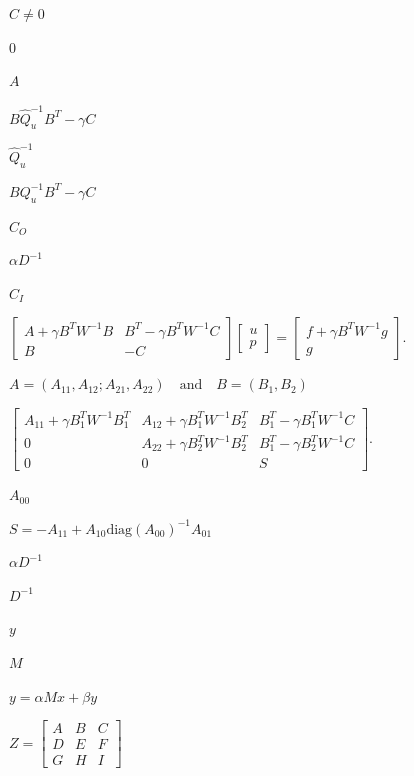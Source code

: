 \documentclass{article}
\begin{document}
$C\neq 0$
\pagebreak

$0$
\pagebreak

$A$
\pagebreak

$B \hat{Q}_u^{-1} B^T - \gamma C$
\pagebreak

$\hat{Q}_u^{-1}$
\pagebreak

$B Q_u^{-1} B^T - \gamma C$
\pagebreak

$C_O$
\pagebreak

$\alpha D^{-1}
$
\pagebreak

$C_I$
\pagebreak

$\left[ \begin{array}{cc}
A + \gamma B^T W^{-1} B & B^T - \gamma B^T W^{-1} C \\
B & -C
\end{array} \right]
\left[ \begin{array}{c}
u \\
p
\end{array} \right]
=
\left[ \begin{array}{c}
f + \gamma B^T W^{-1} g \\
g
\end{array} \right].
$
\pagebreak

$ A = (A_{11}, A_{12}; A_{21}, A_{22})
\quad \mathrm{and} \quad
B = (B_1, B_2)
$
\pagebreak

$\left[ \begin{array}{ccc}
A_{11} + \gamma B_1^T W^{-1} B_1^T & A_{12} + \gamma B_1^T W^{-1} B_2^T & B_1^T - \gamma B_1^T
W^{-1} C \\
0 & A_{22} + \gamma B_2^T W^{-1} B_2^T & B_1^T - \gamma B_2^T W^{-1} C \\
0 & 0 & S
\end{array} \right].
$
\pagebreak

$A_{00}$
\pagebreak

$S = -A_{11} + A_{10} \mbox{diag}(A_{00})^{-1} A_{01}$
\pagebreak

$\alpha D^{-1} $
\pagebreak

$ D^{-1} $
\pagebreak

$y$
\pagebreak

$M$
\pagebreak

$ y = \alpha M x + \beta y $
\pagebreak

$ Z = \left[\begin{array}{ccc}
      A & B & C \\
      D & E & F \\
      G & H & I
    \end{array}\right]$
\pagebreak
\end{document}

